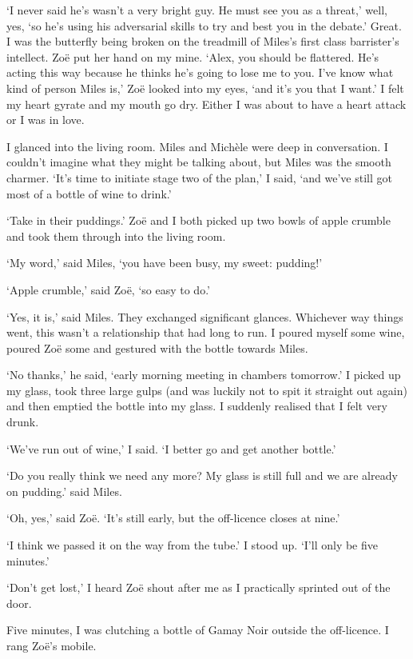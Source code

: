 `I never said he's wasn't a very bright guy. He must see you as a
threat,' well, yes, `so he's using his adversarial skills to try and
best you in the debate.' Great. I was the butterfly being broken on
the treadmill of Miles's first class barrister's intellect. Zoë
put her hand on my mine. `Alex, you should be flattered. He's acting
this way because he thinks he's going to lose me to you. I've know
what kind of person Miles is,' Zoë looked into my eyes, `and
it's you that I want.' I felt my heart gyrate and my mouth go dry.
Either I was about to have a heart attack or I was in love.

I glanced into the living room. Miles and Michèle were deep in
conversation. I couldn't imagine what they might be talking about,
but Miles was the smooth charmer. `It's time to initiate stage two
of the plan,' I said, `and we've still got most of a bottle of wine
to drink.'

`Take in their puddings.' Zoë and I both picked up two bowls of
apple crumble and took them through into the living room.

`My word,' said Miles, `you have been busy, my sweet: pudding!'

`Apple crumble,' said Zoë, `so easy to do.'

`Yes, it is,' said Miles. They exchanged significant glances.
Whichever way things went, this wasn't a relationship that had long
to run. I poured myself some wine, poured Zoë some and gestured
with the bottle towards Miles.

`No thanks,' he said, `early morning meeting in chambers tomorrow.'
I picked up my glass, took three large gulps (and was luckily not to
spit it straight out again) and then emptied the bottle into my
glass. I suddenly realised that I felt very drunk.

`We've run out of wine,' I said. `I better go and get another
bottle.'

`Do you really think we need any more? My glass is still full and we
are already on pudding.' said Miles.

`Oh, yes,' said Zoë. `It's still early, but the off-licence
closes at nine.'

`I think we passed it on the way from the tube.' I stood up. `I'll only
be five minutes.'

`Don't get lost,' I heard Zoë shout after me as I practically
sprinted out of the door.

Five minutes, I was clutching a bottle of Gamay Noir outside the
off-licence. I rang Zoë's mobile.

